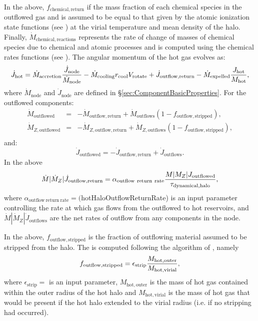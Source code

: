 In the above, $f_\mathrm{chemical,return}$ if the mass fraction of each chemical species in the outflowed gas and is assumed to be equal to that given by the atomic ionization state functions (see ) at the virial temperature and mean density of the halo. Finally, $\dot{M}_\mathrm{chemical,reactions}$ represents the rate of change of masses of chemical species due to chemical and atomic processes and is computed using the chemical rates functions (see ). The angular momentum of the hot gas evolves as:
\begin{equation}
 \dot{J}_\mathrm{hot} = \dot{M}_\mathrm{accretion} {\dot{J}_\mathrm{node} \over \dot{M}_\mathrm{node}} - \dot{M}_\mathrm{cooling} r_\mathrm{cool} V_\mathrm{rotate} + \dot{J}_\mathrm{outflow,return} - \dot{M}_\mathrm{expelled} {J_\mathrm{hot} \over M_\mathrm{hot}},
\end{equation}
where $\dot{M}_\mathrm{node}$ and $\dot{J}_\mathrm{node}$ are defined in \S\ref{sec:ComponentBasicProperties}. For the outflowed components:
\begin{eqnarray}
 \dot{M}_\mathrm{outflowed} &=& - \dot{M}_\mathrm{outflow,return} + \dot{M}_\mathrm{outflows} (1-f_\mathrm{outflow, stripped}), \\
 \dot{M}_{Z, \mathrm{outflowed}} &=& - \dot{M}_{Z, \mathrm{outflow,return}} + \dot{M}_{Z, \mathrm{outflows}} (1-f_\mathrm{outflow, stripped}), \\
\end{eqnarray}
and:
\begin{equation}
 \dot{J}_\mathrm{outflowed} = - \dot{J}_\mathrm{outflow,return} + \dot{J}_\mathrm{outflows}.
\end{equation}
In the above
\begin{equation}
 \dot{M}|\dot{M}_Z|\dot{J}_\mathrm{outflow,return} = \alpha_\mathrm{outflow~return~rate} {M|M_Z|J_\mathrm{outflowed}\over \tau_\mathrm{dynamical, halo}},
\end{equation}
where $\alpha_\mathrm{outflow~return~rate}=(${\normalfont \ttfamily hotHaloOutflowReturnRate}) is an input parameter controlling the rate at which gas flows from the outflowed to hot reservoirs, and $\dot{M}|\dot{M}_Z|\dot{J}_\mathrm{outflows}$ are the net rates of outflow from any components in the node.

In the above, $f_\mathrm{outflow, stripped}$ is the fraction of outflowing material assumed to be stripped from the halo. The is computed following the algorithm of \cite{font_colours_2008}, namely
\begin{equation}
f_\mathrm{outflow, stripped} = \epsilon_\mathrm{strip} {M_\mathrm{hot, outer} \over  M_\mathrm{hot, virial}},
\end{equation}
where $\epsilon_\mathrm{strip}=${\normalfont \ttfamily [hotHaloOutflowStrippingEfficiency]} is an input parameter, $M_\mathrm{hot, outer}$ is the mass of hot gas contained within the outer radius of the hot halo and $M_\mathrm{hot, virial}$ is the mass of hot gas that would be present if the hot halo extended to the virial radius (i.e. if no stripping had occurred).


